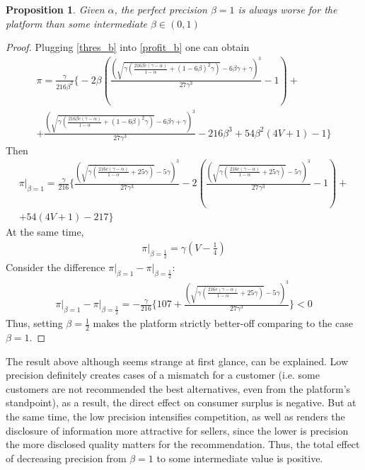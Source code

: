 \documentclass[a4paper]{article}
\newtheorem{proposition}[theorem]{Proposition}
\begin{document}
\begin{proposition}
	Given $\alpha$, the perfect precision $\beta = 1$ is always worse for the platform than some intermediate $\beta \in (0, 1)$
\end{proposition}
\begin{proof}
	Plugging \eqref{thres_b} into \eqref{profit_b} one can obtain
	\begin{align*}
	\pi = \frac{\gamma}{216 \beta ^2}  \biggl\{-2 \beta  \left(\frac{\left(\sqrt{\gamma  \left(\frac{216 \beta  c (\gamma-\alpha)}{1-\alpha}+(1-6
				\beta )^2 \gamma \right)}-6 \beta  \gamma +\gamma \right)^3}{27 \gamma ^3}-1\right)+\\
			+\frac{\left(\sqrt{\gamma 
				\left(\frac{216 \beta  c (\gamma - \alpha)}{1-\alpha}+(1-6 \beta )^2 \gamma \right)}-6 \beta  \gamma +\gamma
			\right)^3}{27 \gamma ^3}-216 \beta ^3+54 \beta ^2 (4 V+1)-1\biggr\}
	\end{align*}
	Then
	\begin{align*}
	\pi\bigg|_{\beta = 1} = \frac{\gamma }{216} \biggl\{\frac{\left(\sqrt{\gamma  \left(\frac{216 c (\gamma-\alpha)}{1-\alpha}+25 \gamma \right)}-5
		\gamma \right)^3}{27 \gamma ^3}-2 \left(\frac{\left(\sqrt{\gamma  \left(\frac{216 c (\gamma-\alpha)}{1-\alpha}+25
			\gamma \right)}-5 \gamma \right)^3}{27 \gamma ^3}-1\right)+\\
		+54 (4 V+1)-217\biggr\}
	\end{align*}
	At the same time, 
	\begin{align*}
	\pi \bigg|_{\beta = \frac{1}{2}} = \gamma  \left(V-\frac{1}{4}\right)
	\end{align*}
	Consider the difference $\pi\bigg|_{\beta = 1} - \pi\bigg|_{\beta = \frac{1}{2}}$:
	\begin{align*}
	\pi\bigg|_{\beta = 1} - \pi\bigg|_{\beta = \frac{1}{2}} = -\frac{\gamma}{216} \biggl\{ 107+ \frac{\left(\sqrt{\gamma  \left(\frac{216 c (\gamma-\alpha)}{1-\alpha}+25 \gamma \right)}-5
		\gamma \right)^3}{27 \gamma ^3} \biggr\} < 0
	\end{align*}
	Thus, setting $\beta = \frac{1}{2}$ makes the platform strictly better-off comparing to the case $\beta = 1$.
\end{proof}
The result above although seems strange at first glance, can be explained. Low precision definitely creates cases of a mismatch for a customer (i.e. some customers are not recommended the best alternatives, even from the platform's standpoint), as a result, the direct effect on consumer surplus is negative. But at the same time, the low precision intensifies competition, as well as renders the disclosure of information more attractive for sellers, since the lower is precision the more disclosed quality matters for the recommendation. Thus, the total effect of decreasing precision from $\beta = 1$ to some intermediate value is positive. 
\end{document}
